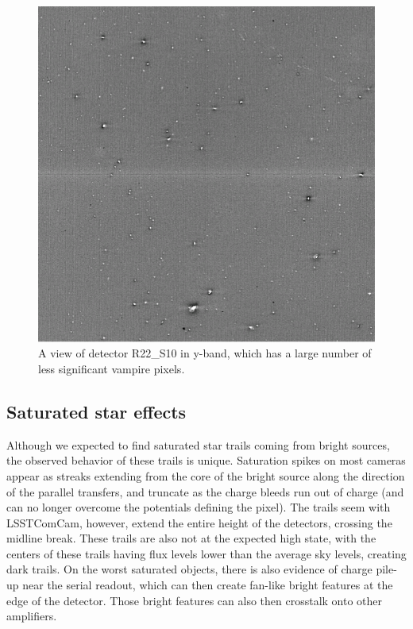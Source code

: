 \begin{figure}
  \begin{center}
  \includegraphics[width=\textwidth]{figures/isr-f04-vampire_pixels_y_det03.png}
  \caption{A view of detector R22\_S10 in y-band, which has a large number of less significant vampire pixels.}
  \end{center}
\end{figure}


\subsection{Saturated star effects}

Although we expected to find saturated star trails coming from bright sources, the observed behavior of these trails is unique.
Saturation spikes on most cameras appear as streaks extending from the core of the bright source along the direction of the parallel transfers, and truncate as the charge bleeds run out of charge (and can no longer overcome the potentials defining the pixel).
The trails seem with LSSTComCam, however, extend the entire height of the detectors, crossing the midline break.
These trails are also not at the expected high state, with the centers of these trails having flux levels lower than the average sky levels, creating dark trails.
On the worst saturated objects, there is also evidence of charge pile-up near the serial readout, which can then create fan-like bright features at the edge of the detector.
Those bright features can also then crosstalk onto other amplifiers.

